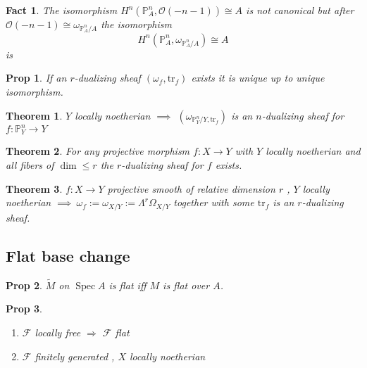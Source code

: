 \documentclass[a4paper, 12pt]{article}
\newcommand{\ca}[1]{\mathcal{#1}}
\newcommand{\caf}{\mathcal{F}}
\newcommand{\bbp}{\mathbb{P}}
\newtheorem*{prop}{Prop}
\newtheorem*{fact}{Fact}
\newtheorem*{thm}{Theorem}
\DeclareMathOperator{\spec}{Spec}
\begin{document}
	\begin{fact}
		The isomorphism $ H^n(\bbp^n_A , \ca{O}(-n-1)) \cong A $ is not canonical but after $ \ca{O}(-n-1) \cong \omega_{\bbp^n_A /A} $ the isomorphism 
		\[ H^n(\bbp^n_A, \omega_{\bbp^n_A/A}) \cong A \]
		is 
	\end{fact}
	
	\begin{prop}
		If an $ r $-dualizing sheaf $ (\omega_f , \mathrm{tr}_f) $ exists it is unique up to unique isomorphism.
	\end{prop}
	
	\begin{thm}
		$ Y $ locally noetherian $ \implies $ $ (\omega_{\mathbb{P}^n_Y/Y , \mathrm{tr}_f}) $ is an $ n $-dualizing sheaf for $ f:\bbp^n_Y \longrightarrow Y $
	\end{thm}
	
	\begin{thm}
		For any projective morphism $ f:X \rightarrow Y $ with $ Y $ locally noetherian and all fibers of $ \dim \le r $ the $ r $-dualizing sheaf for $ f $ exists.
	\end{thm}
	
	\begin{thm}
		$ f:X \rightarrow Y $ projective smooth of relative dimension $ r $ , $ Y $ locally noetherian $ \implies \: \omega_f := \omega_{X/Y} := \Lambda^r\Omega_{X/Y} $ together with some $ \mathrm{tr}_f $ is an $ r $-dualizing sheaf. 
	\end{thm}
	
	
	
	
	
	
	\subsection{Flat base change}
	
	\begin{prop}
		$ \widetilde{M}  $ on $ \spec A $ is flat iff $ M $ is flat over $ A $.
	\end{prop}
	
	\begin{prop}
		\begin{enumerate}
			\item $ \caf $ locally free $ \Rightarrow $ $ \caf $ flat
			\item $ \caf $ finitely generated , $ X $ locally noetherian
		\end{enumerate}
	\end{prop}
	
\end{document}
